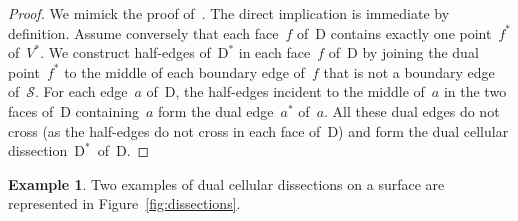 \documentclass{amsart}
\theoremstyle{definition}
\newtheorem{example}[theorem]{Example}
\newtheorem{remark}[theorem]{Remark}
\newcommand{\fref}[1]{Figure~\ref{#1}} %
\newcommand{\surface}{\mathcal{S}} %
\newcommand{\dual}{^*} %
\newcommand{\dissection}{\mathrm{D}} %
\begin{document}
\begin{proof}
We mimick the proof of~\cite[Prop.~1.12]{OpperPlamondonSchroll}.
The direct implication is immediate by definition.
Assume conversely that each face~$f$ of~$\dissection$ contains exactly one point~$f\dual$ of~$V\dual$.
We construct half-edges of~$\dissection\dual$ in each face~$f$ of~$\dissection$ by joining the dual point~$f\dual$ to the middle of each boundary edge of~$f$ that is not a boundary edge of~$\surface$.
For each edge~$a$ of~$\dissection$, the half-edges incident to the middle of~$a$ in the two faces of~$\dissection$ containing~$a$ form the dual edge~$a\dual$ of~$a$.
All these dual edges do not cross (as the half-edges do not cross in each face of~$\dissection$) and form the dual cellular dissection~$\dissection\dual$~of~$\dissection$.
\end{proof}


\begin{example}
Two examples of dual cellular dissections on a surface are represented in \fref{fig:dissections}.
\end{example}
\end{document}
